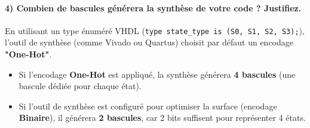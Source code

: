 \documentclass[11pt,a4paper]{article}
\begin{document}
\paragraph{4) Combien de bascules générera la synthèse de votre code ? Justifiez.}
En utilisant un type énuméré VHDL (\texttt{type state\_type is (S0, S1, S2, S3);}), l'outil de synthèse (comme Vivado ou Quartus) choisit par défaut un encodage \textbf{"One-Hot"}. 
\begin{itemize}
    \item Si l'encodage \textbf{One-Hot} est appliqué, la synthèse générera \textbf{4 bascules} (une bascule dédiée pour chaque état).
    \item Si l'outil de synthèse est configuré pour optimiser la surface (encodage \textbf{Binaire}), il générera \textbf{2 bascules}, car 2 bits suffisent pour représenter 4 états.
\end{itemize}
\end{document}
